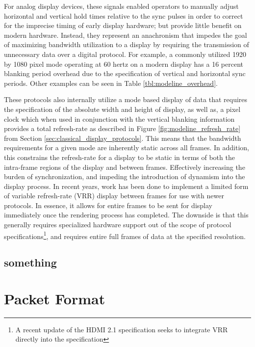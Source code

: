         For analog display devices, these signals enabled operators to manually adjust horizontal and vertical hold times relative to the sync pulses in order to correct for the imprecise timing of early display hardware; but provide little benefit on modern hardware. Instead, they represent an anachronism that impedes the goal of maximizing bandwidth utilization to a display by requiring the transmission of unnecessary data over a digital protocol. For example, a commonly utilized 1920 by 1080 pixel mode operating at 60 hertz\cite{MythTVWebsite} on a modern display has a 16 percent blanking period overhead due to the specification of vertical and horizontal sync periods. Other examples can be seen in Table \ref{tbl:modeline_overhead}.

        These protocols also internally utilize a mode based display of data that requires the specification of the absolute width and height of display, as well as, a pixel clock which when used in conjunction with the vertical blanking information provides a total refresh-rate as described in Figure \ref{fig:modeline_refresh_rate} from Section \ref{sec:classical_display_protocols}. This means that the bandwidth requirements for a given mode are inherently static across all frames. In addition, this constrains the refresh-rate for a display to be static in terms of both the intra-frame regions of the display and between frames. Effectively increasing the burden of synchronization, and impeding the introduction of dynamism into the display process. In recent years, work has been done to implement a limited form of variable refresh-rate (VRR) display between frames for use with newer protocols\cite{AMDFreesync,NVIDIAGsync}. In essence, it allows for entire frames to be sent for display immediately once the rendering process has completed. The downside is that this generally requires specialized hardware support out of the scope of protocol specifications\footnote{A recent update of the HDMI 2.1 specification\cite{HDMIForum2018} seeks to integrate VRR directly into the specification}, and requires entire full frames of data at the specified resolution.

    \subsection{something}


\section{Packet Format}



